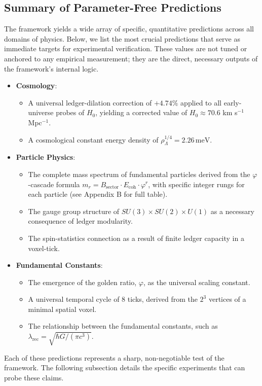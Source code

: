\documentclass[11pt,a4paper]{article}
\begin{document}
\subsection{Summary of Parameter-Free Predictions}
The framework yields a wide array of specific, quantitative predictions across all domains of physics. Below, we list the most crucial predictions that serve as immediate targets for experimental verification. These values are not tuned or anchored to any empirical measurement; they are the direct, necessary outputs of the framework's internal logic.

\begin{itemize}
    \item \textbf{Cosmology}:
    \begin{itemize}
        \item A universal ledger-dilation correction of \(+4.74\%\) applied to all early-universe probes of \(H_0\), yielding a corrected value of \(H_0 \approx 70.6\) km s\(^{-1}\) Mpc\(^{-1}\).
        \item A cosmological constant energy density of \(\rho_\Lambda^{1/4} = 2.26\,\mathrm{meV}\).
    \end{itemize}

    \item \textbf{Particle Physics}:
    \begin{itemize}
        \item The complete mass spectrum of fundamental particles derived from the \(\varphi\)-cascade formula \(m_r = B_{\text{sector}} \cdot E_{\text{coh}} \cdot \varphi^r\), with specific integer rungs for each particle (see Appendix B for full table).
        \item The gauge group structure of \(SU(3) \times SU(2) \times U(1)\) as a necessary consequence of ledger modularity.
        \item The spin-statistics connection as a result of finite ledger capacity in a voxel-tick.
    \end{itemize}

    \item \textbf{Fundamental Constants}:
    \begin{itemize}
        \item The emergence of the golden ratio, \(\varphi\), as the universal scaling constant.
        \item A universal temporal cycle of 8 ticks, derived from the \(2^3\) vertices of a minimal spatial voxel.
        \item The relationship between the fundamental constants, such as \(\lambda_{\text{rec}} = \sqrt{\hbar G / (\pi c^3)}\).
    \end{itemize}
\end{itemize}
Each of these predictions represents a sharp, non-negotiable test of the framework. The following subsection details the specific experiments that can probe these claims.
\end{document}
